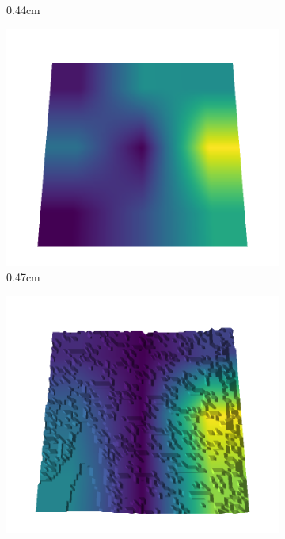\documentclass[../document.tex]{subfiles}
\begin{document}
\begin{figure}[H]
\begin{subfigure}[b]{0.192\linewidth}
    \caption{0.44cm}
    \label{fig : quarry-best-6}
    \end{subfigure}
    \begin{subfigure}[b]{0.192\linewidth}
    \includegraphics[width=\linewidth]{../img/5/quarry/best/46-patch-3d-majavi-colormap-70.png}
    \caption{0.47cm}
    \label{fig : quarry-best-7}
    \end{subfigure}
    \begin{subfigure}[b]{0.192\linewidth}
    \includegraphics[width=\linewidth]{../img/5/quarry/best/49-patch-3d-majavi-colormap-80.png}

\end{subfigure}
\end{figure}
\end{document}
